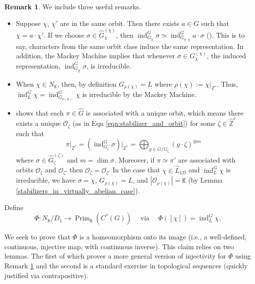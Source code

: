 \documentclass[11pt, twoside]{amsart}
\newcommand{\te}[1]{\operatorname{#1}}
\newcommand{\zn}{\mathbb{Z}}
\newcommand{\mc}{\mathcal}
\newcommand{\mt}{\mathtt}
\newcommand{\wh}{\widehat}
\renewcommand{\l}{\left}
\renewcommand{\r}{\right}
\theoremstyle{definition}
\newtheorem{rmk}[thm]{Remark}
\newcommand{\B}{\mathbb}
\newcommand{\Z}{\B{Z}}
\begin{document}
\begin{rmk}\label{rmk:orbits_same_induced}
We include three useful remarks.
\begin{itemize}
\item[(i)] Suppose $\chi$, $\chi'$ are in the same orbit. Then there exists $a\in G$ such that $\chi=a\cdot \chi'$. If we choose $\sigma\in\wh{G}_{\chi}^{(\chi)}$, then $\te{ind}_{G_{\chi}}^G\sigma\simeq \te{ind}_{G_{a\cdot \chi}}^Ga\cdot \sigma$ (\cite[Prop~2.39]{KanTay13}). This is to say, characters from the same orbit class induce the same representation. In addition, the Mackey Machine implies that whenever $\sigma\in G_{\chi}^{(\chi)}$, the induced representation, $\te{ind}_{G_{\chi}}^G\sigma$, is irreducible.
\item[(ii)] When $\chi\in N_{\mt K}$, then, by definition $G_{\rho(\chi)}=L$ where $\rho(\chi):=\chi|_{\Z^r}$. Thus, $\te{ind}_L^G\chi=\te{ind}_{G_{\rho(\chi)}}^G\,\chi$ is irreducible by the Mackey Machine.
\item[(iii)] \cite[Sec 4.1]{KanTay13} shows that each $\pi\in\wh{G}$ is associated with a unique orbit, which means there exists a unique $\mc{O}_{\zeta}$ (as in Eqn \ref{eqn:stabilizer_and_orbit}) for some $\zeta\in\wh{\zn}^r$ such that
\[\pi|_{\zn^r}=\l(\te{ind}_{G_{\zeta}}^G\sigma\r)\bigg|_{\zn^r}=\bigoplus_{g\in G\slash G_{\zeta}}(g\cdot \zeta)^{\oplus m}\]
where $\sigma\in\wh{G}_{\zeta}^{(\zeta)}$ and $m=\dim\sigma$. Moreover, if $\pi\simeq\pi'$ are associated with orbits $\mc{O}_{\zeta}$ and $\mc{O}_{\zeta'}$ then $\mc{O}_{\zeta}=\mc{O}_{\zeta'}$ In the case that $\chi\in \wh{L}_{1D}$ and $\te{ind}_L^G\chi$ is irreducible, we have $\sigma=\chi$, $G_{\rho(\chi)}=L$, and $|\mc{O}_{\rho(\chi)}|=\mt{K}$ (by Lemma \ref{stabilizers_in_virtually_abelian_case}).
\end{itemize}
\end{rmk}



 Define
\[\Phi:N_{\mt{K}}/D_1\rightarrow \te{Prim}_{\mt{K}}(C^*(G))\quad\te{via}\quad\Phi([\chi])=\te{ind}_L^G \chi.\]

We seek to prove that $\Phi$ is a homeomorphism onto its image (i.e., a well-defined, continuous, injective map, with continuous inverse). This claim relies on two lemmas. The first of which proves a more general version of injectivity for $\Phi$ using Remark \ref{rmk:orbits_same_induced} and the second is a standard exercise in topological sequences (quickly justified via contrapositive).
\end{document}
